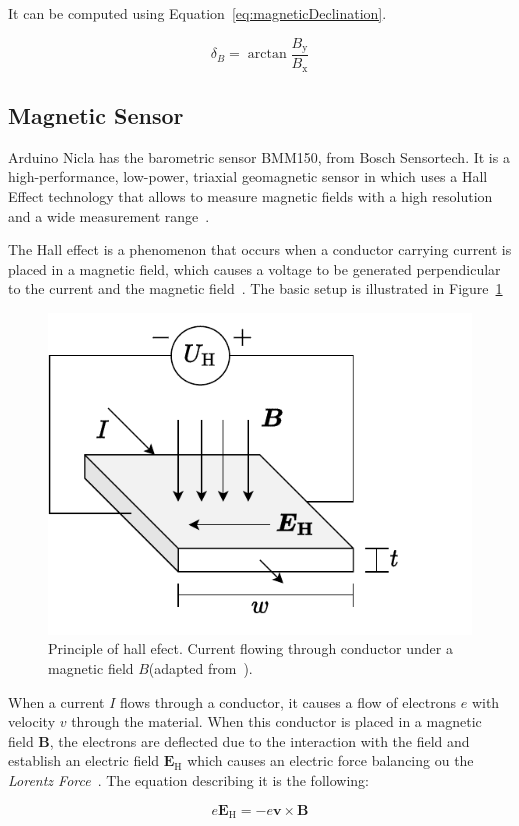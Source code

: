 \documentclass[DIV=14]{scrartcl}
\begin{document}
    It can be computed using Equation~\ref{eq:magneticDeclination}.

    \begin{equation}
        \delta_B = \arctan{\frac{B_{\mathrm{y}}}{B_{\mathrm{x}}}}
        \label{eq:magneticDeclination}
    \end{equation}

    \subsection{Magnetic Sensor}\label{subsec:magnetic-sensor}

    Arduino Nicla has the barometric sensor BMM150, from Bosch Sensortech.
    It is a high-performance, low-power, triaxial geomagnetic sensor in which uses
    a Hall Effect technology that allows to measure magnetic fields with a high resolution and a wide measurement range~\cite{BMM150}.

    The Hall effect is a phenomenon that occurs when a conductor carrying current
    is placed in a magnetic field, which causes a voltage to be generated perpendicular to the current and the magnetic field~\cite{labManual}.
    The basic setup is illustrated in Figure~\ref{fig:hallEffect}

    \begin{figure}[!h]
        \centering
        \includegraphics[width=.3\textwidth]{figures/HallEffect}
        \caption{Principle of hall efect. Current flowing through conductor under a magnetic field $B$(adapted from~\cite{labManual}).}
        \label{fig:hallEffect}
    \end{figure}

    When a current $I$ flows through a conductor, it causes a flow of electrons $e$ with velocity $v$ through the material.
    When this conductor is placed in a magnetic field $\boldsymbol{B}$, the electrons are deflected due to the interaction with the field
    and establish an electric field  $\boldsymbol{E_{\mathrm{H}}}$ which causes an electric force balancing ou the
    \textit{Lorentz Force}~\cite{labManual}.
    The equation describing it is the following:

    \begin{equation}
        e\boldsymbol{E_{\mathrm{H}}} = -e\boldsymbol{v} \times \boldsymbol{B}
        \label{eq:forceBalances}
    \end{equation}
\end{document}

